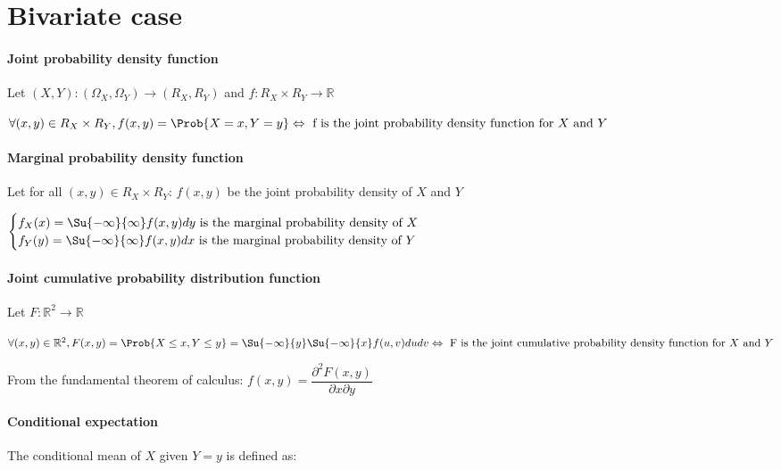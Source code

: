 \section{Bivariate case}
\paragraph{Joint probability density function}
Let $\left(X,Y\right):\left(\Omega_{X},\Omega_{Y}\right)\rightarrow\left(R_{X},R_{Y}\right)$ and $f:R_{X}\times R_{Y}\rightarrow \mathbb{R}$
\begin{center}
	$\forall (x,y)\in R_{X}\times R_{Y},f(x,y)=\Prob{X=x,Y=y}\Leftrightarrow\text{ f is the joint probability density function for }X\text{ and }Y$
\end{center}

\paragraph{Marginal probability density function}
Let for all $(x,y)\in R_{X}\times R_{Y}$: $f(x,y)$ be the joint probability density of $X$ and $Y$
\begin{center}
$\begin{cases}
	f_{X}(x)=\Su{{-\infty}}{\infty}f(x,y)dy\text{ is the marginal probability density of }X\\
	f_{Y}(y)=\Su{{-\infty}}{\infty}f(x,y)dx\text{ is the marginal probability density of }Y
\end{cases}$
\end{center}
\paragraph{Joint cumulative probability distribution function}
Let $F:\mathbb{R}^{2}\rightarrow\mathbb{R}$
\begin{center}
	$\forall (x,y)\in \mathbb{R}^{2},F(x,y)=\Prob{X\leq x,Y\leq y}=\Su{ {-\infty}}{y}\Su{ {-\infty}}{x}f(u,v)dudv\Leftrightarrow\text{ F is the joint cumulative probability density function for }X\text{ and }Y$
\end{center}
From the fundamental theorem of calculus:
$f(x,y)=\dfrac{\partial^{2}F(x,y)}{\partial x\partial y}$


\paragraph{Conditional expectation}
The conditional mean of $X$ given $Y=y$ is defined as:
\begin{center}
\end{center}

